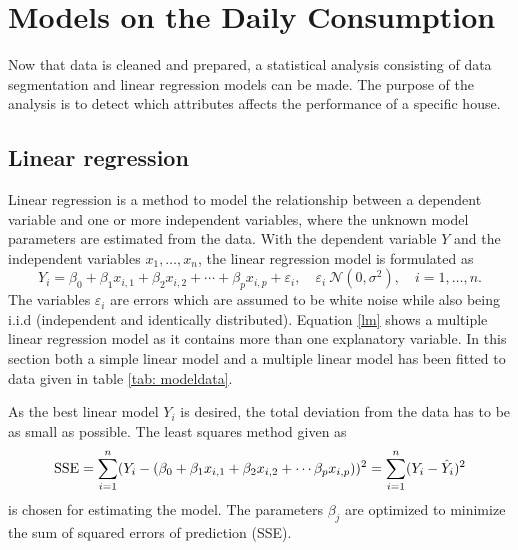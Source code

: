 \chapter{Models on the Daily Consumption}
\label{chap: daily}
Now that data is cleaned and prepared, a statistical analysis consisting of data segmentation and linear regression models can be made. The purpose of the analysis is to detect which attributes affects the performance of a specific house.

\section{Linear regression}
Linear regression is a method to model the relationship between a dependent variable and one or more independent variables, where the unknown model parameters are estimated from the data. With the dependent variable $Y$ and the independent variables $x_1, \dots, x_n$, the linear regression model is formulated as
\begin{equation}
    Y_i = \beta_0 + \beta_1 x_{i,1} + \beta_2 x_{i,2} + \cdots + \beta_p x_{i,p} + \varepsilon_i, \quad \varepsilon_i ~ \mathcal{N}(0,\sigma^2), \quad i = 1,\dots, n. \label{lm}
\end{equation}
The variables $\varepsilon_i$ are errors which are assumed to be white noise while also being i.i.d (independent and identically distributed). Equation \eqref{lm} shows a multiple linear regression model as it contains more than one explanatory variable. In this section both a simple linear model and a multiple linear model has been fitted to data given in table \ref{tab: modeldata}.

\noindent As the best linear model $Y_i$ is desired, the total deviation from the data has to be as small as possible. The least squares method given as
\begin{equation}
    \text{SSE} = \sum_{i=1}^n (Y_i - (\beta_0 + \beta_1 x_{i,1} + \beta_2 x_{i,2} + \cdots  \beta_p x_{i,p}))^2 = \sum_{i=1}^n (Y_i - \Hat{Y}_i)^2
\end{equation}
is chosen for estimating the model. The parameters $\beta_j$ are optimized to minimize the sum of squared errors of prediction (SSE).

